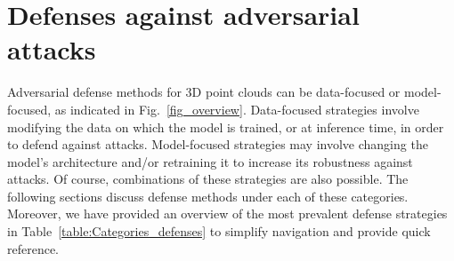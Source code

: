 \documentclass{ieeeaccess}
\def\etal{\textit{et al.}}
\begin{document}

\section{Defenses against adversarial attacks}
\label{sec:Defense}

Adversarial defense methods for 3D point clouds can be data-focused or model-focused, as indicated in Fig.~\ref{fig_overview}. Data-focused strategies involve modifying the data on which the model is trained, or at inference time, in order to defend against attacks. Model-focused strategies may involve changing the model's architecture and/or retraining it to increase its robustness against attacks. Of course, combinations of these strategies are also possible. %
The following sections discuss defense methods under each of these categories. Moreover, we have provided an overview of the most prevalent defense strategies in Table~\ref{table:Categories_defenses} to simplify navigation and provide quick reference.



\end{document}
